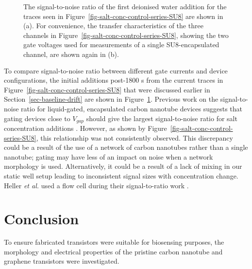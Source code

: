 \documentclass[
  a4paper,
]{scrbook}
\begin{document}
\begin{figure}
\begin{minipage}[t]{0.45\linewidth}
{{}

}

\subcaption{\label{fig-transfer-sweep-2}}
\end{minipage}%

\caption{\label{fig-salt-conc-SNR}The signal-to-noise ratio of the first
deionised water addition for the traces seen in
Figure~\ref{fig-salt-conc-control-series-SU8} are shown in (a). For
convenience, the transfer characteristics of the three channels in
Figure~\ref{fig-salt-conc-control-series-SU8}, showing the two gate
voltages used for measurements of a single SU8-encapsulated channel, are
shown again in (b).}

\end{figure}

To compare signal-to-noise ratio between different gate currents and
device configurations, the initial additions post-1800 s from the
current traces in Figure~\ref{fig-salt-conc-control-series-SU8} that
were discussed earlier in Section~\ref{sec-baseline-drift} are shown in
Figure~\ref{fig-salt-conc-SNR}. Previous work on the signal-to-noise
ratio for liquid-gated, encapsulated carbon nanotube devices suggests
that gating devices close to \(V_{gap}\) should give the largest
signal-to-noise ratio for salt concentration additions
\autocite{Heller2009}. However, as shown by
Figure~\ref{fig-salt-conc-control-series-SU8}, this relationship was not
consistently observed. This discrepancy could be a result of the use of
a network of carbon nanotubes rather than a single nanotube; gating may
have less of an impact on noise when a network morphology is used.
Alternatively, it could be a result of a lack of mixing in our static
well setup leading to inconsistent signal sizes with concentration
change. Heller \emph{et al.} used a flow cell during their
signal-to-ratio work \autocite{Heller2009}.

\hypertarget{conclusion}{%
\section{Conclusion}\label{conclusion}}

To ensure fabricated transistors were suitable for biosensing purposes,
the morphology and electrical properties of the pristine carbon nanotube
and graphene transistors were investigated.
\end{document}
